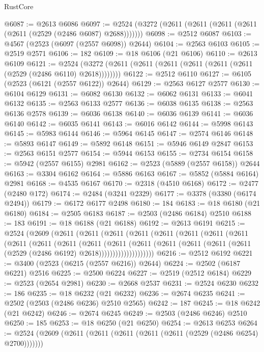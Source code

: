 \begin{lexlean}{RustCore}
\begin{coremodule}
@6087 := @2613 @6086
@6097 := @2524 (@3272 (@2611 (@2611 (@2611 (@2611 (@2611 (@2529 (@2486 @6087) @2688)))))))
@6098 := @2512 @6087
@6103 := @4567 (@2523 (@6097 (@2557 @6098)) @2644)
@6104 := @2563 @6103
@6105 := @2519 @2571
@6106 := 182
@6109 := @18 @6106 (@21 @6106)
@6110 := @2613 @6109
@6121 := @2524 (@3272 (@2611 (@2611 (@2611 (@2611 (@2611 (@2611 (@2529 (@2486 @6110) @2618))))))))
@6122 := @2512 @6110
@6127 := @6105 (@2523 (@6121 (@2557 @6122)) @2644)
@6129 := @2563 @6127 @2577
@6130 := @6104 @6129
@6131 := @6082 @6130
@6132 := @6062 @6131
@6133 := @6041 @6132
@6135 := @2563 @6133 @2577
@6136 := @6038 @6135
@6138 := @2563 @6136 @2578
@6139 := @6036 @6138
@6140 := @6036 @6139
@6141 := @6036 @6140
@6142 := @6035 @6141
@6143 := @6016 @6142
@6144 := @5998 @6143
@6145 := @5983 @6144
@6146 := @5964 @6145
@6147 := @2574 @6146
@6148 := @5893 @6147
@6149 := @5892 @6148
@6151 := @5946 @6149 @2847
@6153 := @2563 @6151 @2577
@6154 := @5944 @6153
@6155 := @2734 @6154
@6158 := @5942 (@2557 @6155) @2981
@6162 := @2523 (@5889 (@2557 @6158)) @2644
@6163 := @3304 @6162
@6164 := @5886 @6163
@6167 := @5852 (@5884 @6164) @2981
@6168 := @4535 @6167
@6170 := @2318 (@4510 @6168)
@6172 := @2477 (@2480 @172)
@6174 := @2484 (@3241 @2329)
@6177 := @3378 (@3380 (@6174 @2494))
@6179 := @6172 @6177 @2498
@6180 := 184
@6183 := @18 @6180 (@21 @6180)
@6184 := @2505 @6183
@6187 := @2503 (@2486 @6184) @2510
@6188 := 183
@6191 := @18 @6188 (@21 @6188)
@6192 := @2613 @6191
@6215 := @2524
    (@2609
      (@2611
        (@2611
          (@2611
            (@2611
              (@2611
                (@2611
                  (@2611
                    (@2611
                      (@2611
                        (@2611
                          (@2611
                            (@2611
                              (@2611
                                (@2611
                                  (@2611
                                    (@2611
                                      (@2611 (@2611 (@2529 (@2486 @6192) @2618))))))))))))))))))))
@6216 := @2512 @6192
@6221 := @3400 (@2523 (@6215 (@2557 @6216)) @2644)
@6224 := @2502 (@6187 @6221) @2516
@6225 := @2500 @6224
@6227 := @2519 (@2512 @6184)
@6229 := @2523 (@2654 @2981)
@6230 := @2668 @2537
@6231 := @2524 @6230
@6232 := 186
@6235 := @18 @6232 (@21 @6232)
@6236 := @2674 @6235
@6241 := @2502 (@2503 (@2486 @6236) @2510 @2565)
@6242 := 187
@6245 := @18 @6242 (@21 @6242)
@6246 := @2674 @6245
@6249 := @2503 (@2486 @6246) @2510
@6250 := 185
@6253 := @18 @6250 (@21 @6250)
@6254 := @2613 @6253
@6264 := @2524 (@2609 (@2611 (@2611 (@2611 (@2611 (@2611 (@2529 (@2486 @6254) @2700)))))))

\end{coremodule}
\end{lexlean}
